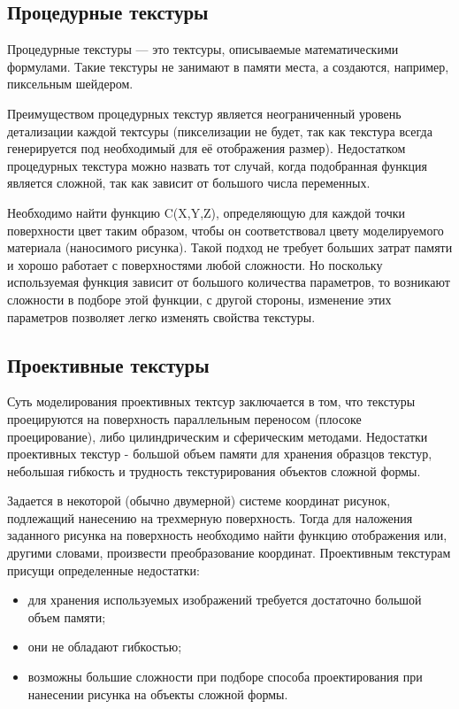\subsection{Процедурные текстуры}
Процедурные текстуры --- это тектсуры, описываемые математическими формулами. Такие текстуры не занимают в памяти места, а создаются, например, пиксельным шейдером.

Преимуществом процедурных текстур является неограниченный уровень детализации каждой тектсуры (пикселизации не будет, так как текстура всегда генерируется под необходимый для её отображения размер). Недостатком процедурных текстура можно назвать тот случай, когда подобранная функция является сложной, так как зависит от большого числа переменных.

Необходимо найти функцию C(X,Y,Z), определяющую для каждой точки поверхности цвет таким образом, чтобы он соответствовал цвету моделируемого материала (наносимого рисунка). Такой подход не требует больших затрат памяти и хорошо работает с поверхностями любой сложности. Но поскольку используемая функция зависит от большого количества параметров, то возникают сложности в подборе этой функции, с другой стороны, изменение этих параметров позволяет легко изменять свойства текстуры.

\subsection{Проективные текстуры}
Суть моделирования проективных тектсур заключается в том, что текстуры проецируются на поверхность параллельным переносом (плосоке проецирование), либо цилиндрическим и сферическим методами.
Недостатки проективных текстур - большой объем памяти для хранения образцов текстур, небольшая гибкость и трудность текстурирования объектов сложной формы. 

Задается в некоторой (обычно двумерной) системе координат рисунок, подлежащий нанесению на трехмерную поверхность.
Тогда для наложения заданного рисунка на поверхность необходимо найти функцию отображения или, другими словами, произвести преобразование координат.
Проективным текстурам присущи определенные недостатки:
\begin{itemize}
	\item для хранения используемых изображений требуется достаточно большой объем памяти;
	\item они не обладают гибкостью;
	\item возможны большие сложности при подборе способа проектирования при нанесении рисунка на объекты сложной формы.
\end{itemize}

